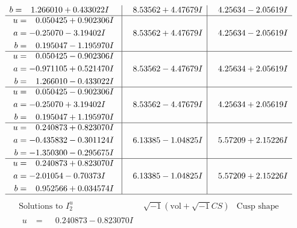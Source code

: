 \documentclass[1p]{elsarticle_modified}
\theoremstyle{definition}
\newcommand{\I}{\sqrt{-1}}
\begin{document}
$$\begin{array}{c|c|c}
\begin{aligned}
b &= \phantom{-}1.266010 + 0.433022 I\end{aligned}
 & \phantom{-}8.53562 + 4.47679 I & \phantom{-}4.25634 - 2.05619 I \\ \hline\begin{aligned}
u &= \phantom{-}0.050425 + 0.902306 I \\
a &= -0.25070 - 3.19402 I \\
b &= \phantom{-}0.195047 - 1.195970 I\end{aligned}
 & \phantom{-}8.53562 + 4.47679 I & \phantom{-}4.25634 - 2.05619 I \\ \hline\begin{aligned}
u &= \phantom{-}0.050425 - 0.902306 I \\
a &= -0.971105 + 0.521470 I \\
b &= \phantom{-}1.266010 - 0.433022 I\end{aligned}
 & \phantom{-}8.53562 - 4.47679 I & \phantom{-}4.25634 + 2.05619 I \\ \hline\begin{aligned}
u &= \phantom{-}0.050425 - 0.902306 I \\
a &= -0.25070 + 3.19402 I \\
b &= \phantom{-}0.195047 + 1.195970 I\end{aligned}
 & \phantom{-}8.53562 - 4.47679 I & \phantom{-}4.25634 + 2.05619 I \\ \hline\begin{aligned}
u &= \phantom{-}0.240873 + 0.823070 I \\
a &= -0.435832 - 0.301124 I \\
b &= -1.350300 - 0.295675 I\end{aligned}
 & \phantom{-}6.13385 - 1.04825 I & \phantom{-}5.57209 + 2.15226 I \\ \hline\begin{aligned}
u &= \phantom{-}0.240873 + 0.823070 I \\
a &= -2.01054 - 0.70373 I \\
b &= \phantom{-}0.952566 + 0.034574 I\end{aligned}
 & \phantom{-}6.13385 - 1.04825 I & \phantom{-}5.57209 + 2.15226 I\\
 \hline 
 \end{array}$$\newpage$$\begin{array}{c|c|c}  
\text{Solutions to }I^u_{2}& \I (\text{vol} + \sqrt{-1}CS) & \text{Cusp shape}\\
 \hline 
\begin{aligned}
u &= \phantom{-}0.240873 - 0.823070 I \\

\end{aligned}
\end{array}$$
\end{document}
